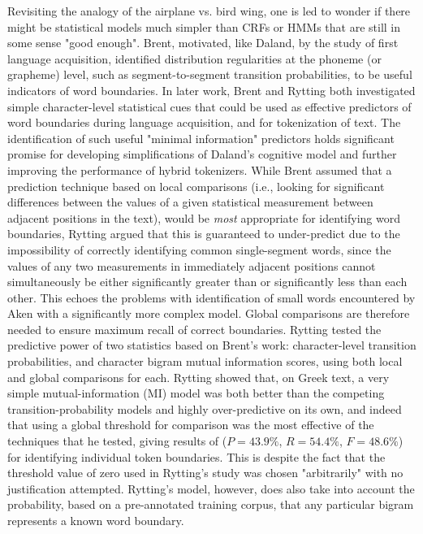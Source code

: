 Revisiting the analogy of the airplane vs. bird wing, one is led to wonder if there might be statistical models much simpler than CRFs or HMMs that are still in some sense "good enough".  Brent, motivated, like Daland, by the study of first language acquisition, identified distribution regularities at the phoneme (or grapheme) level, such as segment-to-segment transition probabilities, to be useful indicators of word boundaries\cite{brent96}. In later work, Brent\cite{brent99} and Rytting\cite{rytting04} both investigated simple character-level statistical cues that could be used as effective predictors of word boundaries during language acquisition, and for tokenization of text. The identification of such useful "minimal information" predictors holds significant promise for developing simplifications of Daland's cognitive model\cite{daland09} and further improving the performance of hybrid tokenizers.
While Brent\cite{brent99} assumed that a prediction technique based on local comparisons (i.e., looking for significant differences between the values of a given statistical measurement between adjacent positions in the text), would be \textit{most} appropriate for identifying word boundaries, Rytting\cite{rytting04} argued that this is guaranteed to under-predict due to the impossibility of correctly identifying common single-segment words, since the values of any two measurements in immediately adjacent positions cannot simultaneously be either significantly greater than or significantly less than each other. This echoes the problems with identification of small words encountered by Aken\cite{aken11} with a significantly more complex model. Global comparisons are therefore needed to ensure maximum recall of correct boundaries.
Rytting\cite{rytting04} tested the predictive power of two statistics based on Brent's work\cite{brent99}: character-level transition probabilities, and character bigram mutual information scores, using both local and global comparisons for each. Rytting \cite{rytting04} showed that, on Greek text, a very simple mutual-information (MI) model was both better than the competing transition-probability models and highly over-predictive on its own, and indeed that using a global threshold for comparison was the most effective of the techniques that he tested, giving results of ($P = 43.9\%$, $R = 54.4\%$, $F = 48.6\%$) for identifying individual token boundaries. This is despite the fact that the threshold value of zero used in Rytting's study\cite{rytting04} was chosen "arbitrarily" with no justification attempted. Rytting's model, however, does also take into account the probability, based on a pre-annotated training corpus, that any particular bigram represents a known word boundary.

